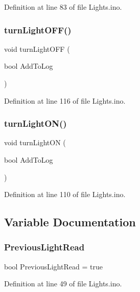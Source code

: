 Definition at line 83 of file Lights.\+ino.

\mbox{\label{_lights_8ino_a221195d6aa942e54a2638ae739dee8ed}} 
\subsubsection{\texorpdfstring{turnLightOFF()}{turnLightOFF()}}
{\footnotesize\ttfamily void turn\+Light\+O\+FF (\begin{DoxyParamCaption}\item[{bool}]{Add\+To\+Log }\end{DoxyParamCaption})}



Definition at line 116 of file Lights.\+ino.

\mbox{\label{_lights_8ino_afe20e2cb268c3ba2aa41e9d99cbae9dc}} 
\subsubsection{\texorpdfstring{turnLightON()}{turnLightON()}}
{\footnotesize\ttfamily void turn\+Light\+ON (\begin{DoxyParamCaption}\item[{bool}]{Add\+To\+Log }\end{DoxyParamCaption})}



Definition at line 110 of file Lights.\+ino.



\subsection{Variable Documentation}
\mbox{\label{_lights_8ino_ab1435d46807c63ec7b7e0b1b3f1d3ba0}} 
\subsubsection{\texorpdfstring{PreviousLightRead}{PreviousLightRead}}
{\footnotesize\ttfamily bool Previous\+Light\+Read = true}



Definition at line 49 of file Lights.\+ino.

